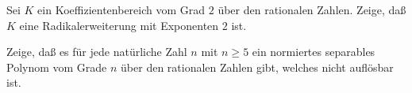 \documentclass{algsheet}
\author{Dipl.-Math.~Arturo Mancino}
\date{02.~Februar 2011}
\begin{document}
                \maketitle


\begin{exercise}
    Sei \(K\) ein Koeffizientenbereich vom Grad \(2\) über den rationalen Zahlen.
    Zeige, daß \(K\) eine Radikalerweiterung mit Exponenten \(2\) ist.
\end{exercise}


\begin{exercise}
    Zeige, daß es für jede
    natürliche Zahl \(n\) mit \(n \ge 5\) ein
    normiertes separables Polynom vom Grade \(n\) über den rationalen Zahlen
    gibt, welches nicht auflösbar ist.
\end{exercise}
\end{document}
